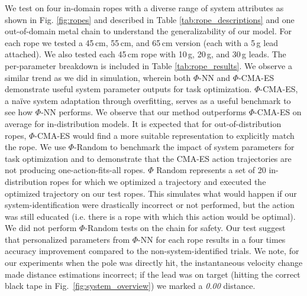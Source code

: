 \documentclass[conference]{IEEEtran}
\begin{document}
We test on four in-domain ropes with a diverse range of system attributes as shown in Fig. \ref{fig:ropes} and described in Table \ref{tab:rope_descriptions} and one out-of-domain metal chain to understand the generalizability of our model. For each rope we tested a 45\,cm, 55\,cm, and 65\,cm version (each with a 5\,g lead attached). We also tested each 45\,cm rope with 10\,g, 20\,g, and 30\,g leads. The per-parameter breakdown is included in Table \ref{tab:rope_results}. We observe a similar trend as we did in simulation, wherein both $\Phi$-NN and $\Phi$-CMA-ES demonstrate useful system parameter outputs for task optimization. $\Phi$-CMA-ES, a na\"ive system adaptation through overfitting, serves as a useful benchmark to see how $\Phi$-NN performs. We observe that our method outperforms $\Phi$-CMA-ES on average for in-distribution models. It is expected that for out-of-distribution ropes, $\Phi$-CMA-ES would find a more suitable representation to explicitly match the rope. We use $\Phi$-Random to benchmark the impact of system parameters for task optimization and to demonstrate that the CMA-ES action trajectories are not producing one-action-fits-all ropes. $\Phi$ Random represents a set of 20 in-distribution ropes for which we optimized a trajectory and executed the optimized trajectory on our test ropes. This simulates what would happen if our system-identification were drastically incorrect or not performed, but the action was still educated (i.e. there is a rope with which this action would be optimal). We did not perform $\Phi$-Random tests on the chain for safety. Our test suggest that personalized parameters from $\Phi$-NN for each rope results in a four times accuracy improvement compared to the non-system-identified trials. We note, for our experiments when the pole was directly hit, the instantaneous velocity change made distance estimations incorrect; if the lead was on target (hitting the correct black tape in Fig.~\ref{fig:system_overview}) we marked a \textit{0.00} distance.
\end{document}
